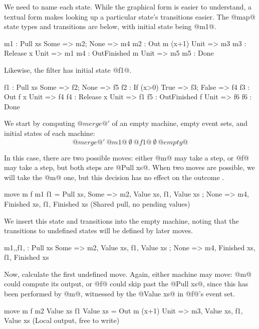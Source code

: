 We need to name each state.
While the graphical form is easier to understand, a textual form makes looking up a particular state's transitions easier.
The @map@ state types and transitions are below, with initial state being @m1@.

\begin{code}
m1 : Pull xs     { Some => m2; None => m4 }
m2 : Out m (x+1) { Unit => m3 }
m3 : Release x   { Unit => m1 }
m4 : OutFinished m{ Unit => m5 }
m5 : Done
\end{code}

Likewise, the filter has initial state @f1@.

\begin{code}
f1 : Pull xs     { Some => f2; None  => f5 }
f2 : If (x>0)    { True => f3; False => f4 }
f3 : Out f x     { Unit => f4 }
f4 : Release x   { Unit => f1 }
f5 : OutFinished f{ Unit => f6 }
f6 : Done
\end{code}

We start by computing $@merge@'$ of an empty machine, empty event sets, and initial states of each machine:
$$
@merge@'~@m1@~\emptyset~@f1@~\emptyset~@empty@
$$

In this case, there are two possible moves: either @m@ may take a step, or @f@ may take a step, but both steps are @Pull xs@. When two moves are possible, we will take the @m@ one, but this decision has no effect on the outcome .
\begin{code}
move m f m1 {} f1 {} =
    Pull xs,
    { Some => m2, {Value xs},    f1, {Value xs}
    ; None => m4, {Finished xs}, f1, {Finished xs} }
(Shared pull, no pending values)
\end{code}

We insert this state and transitions into the empty machine, noting that the transitions to undefined states will be defined by later moves.

\begin{code}
m1,{},f1,{}
    : Pull xs
    { Some => m2, {Value xs},    f1, {Value xs}
    ; None => m4, {Finished xs}, f1, {Finished xs} }
\end{code}

Now, calculate the first undefined move.
Again, either machine may move: @m@ could compute its output, or @f@ could skip past the @Pull xs@, since this has been performed by @m@, witnessed by the @Value xs@ in @f@'s event set.

\begin{code}
move m f m2 {Value xs} f1 {Value xs} =
    Out m (x+1)
    { Unit => m3, {Value xs}, f1, {Value xs} }
(Local output, free to write)
\end{code}

